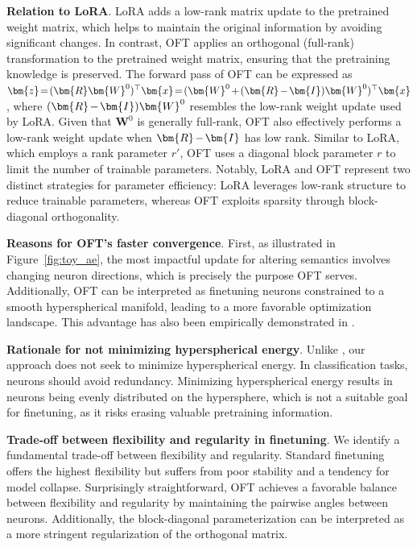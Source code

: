 \textbf{Relation to LoRA}. LoRA adds a low-rank matrix update to the pretrained weight matrix, which helps to maintain the original information by avoiding significant changes. In contrast, OFT applies an orthogonal (full-rank) transformation to the pretrained weight matrix, ensuring that the pretraining knowledge is preserved. The forward pass of OFT can be expressed as $\thickmuskip=2mu \medmuskip=2mu \bm{z}=(\bm{R}\bm{W}^0)^\top\bm{x}=(\bm{W}^0+(\bm{R}-\bm{I})\bm{W}^0)^\top\bm{x}$, where $\thickmuskip=2mu \medmuskip=2mu (\bm{R}-\bm{I})\bm{W}^0$ resembles the low-rank weight update used by LoRA. Given that $\bm{W}^0$ is generally full-rank, OFT also effectively performs a low-rank weight update when $\thickmuskip=2mu \medmuskip=2mu \bm{R}-\bm{I}$ has low rank. Similar to LoRA, which employs a rank parameter $r'$, OFT uses a diagonal block parameter $r$ to limit the number of trainable parameters. Notably, LoRA and OFT represent two distinct strategies for parameter efficiency: LoRA leverages low-rank structure to reduce trainable parameters, whereas OFT exploits sparsity through block-diagonal orthogonality.

\textbf{Reasons for OFT’s faster convergence}. First, as illustrated in Figure~\ref{fig:toy_ae}, the most impactful update for altering semantics involves changing neuron directions, which is precisely the purpose OFT serves. Additionally, OFT can be interpreted as finetuning neurons constrained to a smooth hyperspherical manifold, leading to a more favorable optimization landscape. This advantage has also been empirically demonstrated in \cite{liu2021orthogonal}.

\textbf{Rationale for not minimizing hyperspherical energy}. Unlike \cite{liu2021orthogonal}, our approach does not seek to minimize hyperspherical energy. In classification tasks, neurons should avoid redundancy. Minimizing hyperspherical energy results in neurons being evenly distributed on the hypersphere, which is not a suitable goal for finetuning, as it risks erasing valuable pretraining information.

\textbf{Trade-off between flexibility and regularity in finetuning}. We identify a fundamental trade-off between flexibility and regularity. Standard finetuning offers the highest flexibility but suffers from poor stability and a tendency for model collapse. Surprisingly straightforward, OFT achieves a favorable balance between flexibility and regularity by maintaining the pairwise angles between neurons. Additionally, the block-diagonal parameterization can be interpreted as a more stringent regularization of the orthogonal matrix.

